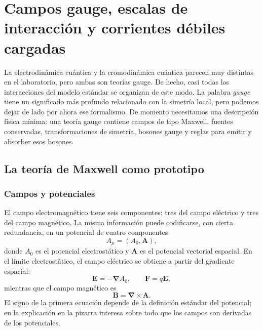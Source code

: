 \chapter{Campos gauge, escalas de interacción y corrientes débiles cargadas}

La electrodinámica cuántica y la cromodinámica cuántica parecen muy distintas en el laboratorio, pero ambas son teorías gauge. De hecho, casi todas las interacciones del modelo estándar se organizan de este modo. La palabra \emph{gauge} tiene un significado más profundo relacionado con la simetría local, pero podemos dejar de lado por ahora ese formalismo. De momento necesitamos una descripción física mínima: una teoría gauge contiene campos de tipo Maxwell, fuentes conservadas, transformaciones de simetría, bosones gauge y reglas para emitir y absorber esos bosones.

\section{La teoría de Maxwell como prototipo}

\subsection{Campos y potenciales}

El campo electromagnético tiene seis componentes: tres del campo eléctrico y tres del campo magnético. La misma información puede codificarse, con cierta redundancia, en un potencial de cuatro componentes
\begin{equation}
A_\mu=(A_0,\boldsymbol A),
\end{equation}
donde \(A_0\) es el potencial electrostático y \(\boldsymbol A\) es el potencial vectorial espacial. En el límite electrostático, el campo eléctrico se obtiene a partir del gradiente espacial:
\begin{equation}
\boldsymbol E=-\boldsymbol\nabla A_0,
\qquad
\boldsymbol F=q\boldsymbol E,
\end{equation}
mientras que el campo magnético es
\begin{equation}
\boldsymbol B=\boldsymbol\nabla\times\boldsymbol A.
\end{equation}
El signo de la primera ecuación depende de la definición estándar del potencial; en la explicación en la pizarra interesa sobre todo que los campos son derivadas de los potenciales.

